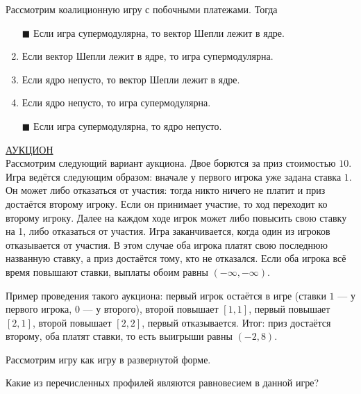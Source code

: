 \task
Рассмотрим коалиционную игру с побочными платежами. Тогда

\begin{enumerate}[label=$\square$]	%
	\item[$\blacksquare$] Если игра супермодулярна, то вектор Шепли лежит в ядре.
	\item Если вектор Шепли лежит в ядре, то игра супермодулярна.
	\item Если ядро непусто, то вектор Шепли лежит в ядре.
	\item Если ядро непусто, то игра супермодулярна.
	\item[$\blacksquare$] Если игра супермодулярна, то ядро непусто.
\end{enumerate}

\task
\underline{АУКЦИОН} \\

Рассмотрим следующий вариант аукциона. Двое борются за приз стоимостью $10$. Игра ведётся следующим образом: вначале у первого игрока уже задана ставка $1$. Он может либо отказаться от участия: тогда никто ничего не платит и приз достаётся второму игроку. Если он принимает участие, то ход переходит ко второму игроку. Далее на каждом ходе игрок может либо повысить свою ставку на 1, либо отказаться от участия. Игра заканчивается, когда один из игроков отказывается от участия. В этом случае оба игрока платят свою последнюю названную ставку, а приз достаётся тому, кто не отказался. Если оба игрока всё время повышают ставки, выплаты обоим равны $(-\infty,-\infty)$.

Пример проведения такого аукциона: первый игрок остаётся в игре (ставки $1$ --- у первого игрока, $0$ --- у второго), второй повышает $[1,1]$, первый повышает $[2,1]$, второй повышает $[2,2]$, первый отказывается. Итог: приз достаётся второму, оба платят ставки, то есть выигрыши равны $(-2,8)$.

Рассмотрим игру как игру в развернутой форме.

Какие из перечисленных профилей являются равновесием в данной игре?

